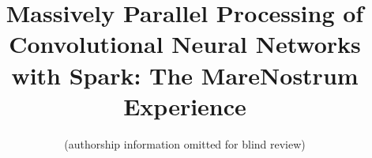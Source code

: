 \documentclass[journal]{IEEEtran}
\begin{document}
\title{Massively Parallel Processing of Convolutional Neural Networks with Spark: The MareNostrum Experience}

%

%                       

\author{
		(authorship information omitted for blind review)

                       
}


%


\maketitle\thispagestyle{empty}
\end{document}
